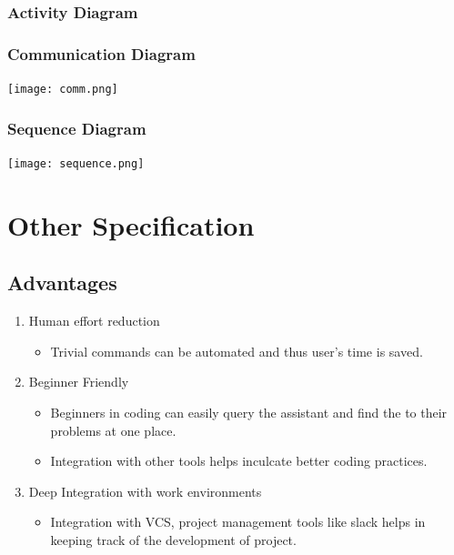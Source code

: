 \documentclass[oneside,a4paper,12pt, times]{book}
\begin{document}
 \subsection{Activity Diagram}
 \begin{/raggedleft}
\texttt{[image: ActivityDiagram.jpg]}}
\captionof{figure}{Activity Diagram}
     \label{fig:my_label}
 \end{/raggedleft}
  
\subsection{Communication Diagram}
\begin{center}
    \centering
    \texttt{[image: comm.png]}
    \label{fig:my_label}
\end{center}
   
\subsection{Sequence Diagram}
\begin{center}
    \centering
    \texttt{[image: sequence.png]}
    \label{fig:my_label}
\end{center}
      



\chapter{Other Specification}
\section{Advantages}
\begin{enumerate}
    \item Human effort reduction
    \begin{itemize}
        \item Trivial commands can be automated and thus user's time is saved. 
    \end{itemize}
    
    \item Beginner Friendly
    \begin{itemize}
        \item Beginners in coding can easily query the assistant and find the to their problems at one place.
        \item Integration with other tools helps inculcate better coding practices.
    \end{itemize}
    \item Deep Integration with work environments
    \begin{itemize}
        \item Integration with VCS, project management tools like slack helps in keeping track of the development of project. 
    \end{itemize}
\end{enumerate}
\end{document}
